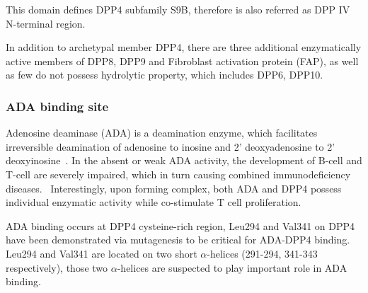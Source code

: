 This domain defines DPP4 subfamily S9B, therefore is also referred as DPP IV N-terminal region.
\par 
In addition to archetypal member DPP4, there are three additional enzymatically active members of DPP8, DPP9 and Fibroblast activation protein (FAP), as well as few do not possess hydrolytic property, which includes DPP6, DPP10. 

\subsubsection{ADA binding site}
Adenosine deaminase (ADA) is a deamination enzyme, which facilitates irreversible deamination of adenosine to inosine and 2' deoxyadenosine to 2' deoxyinosine~\cite{Franco_1998}. In the absent or weak ADA activity, the development of B-cell and T-cell are severely impaired, which in turn causing combined immunodeficiency diseases.~\cite{Cristalli2001} Interestingly, upon forming complex, both ADA and DPP4 possess individual enzymatic activity while co-stimulate T cell proliferation.~\cite{De_Meester_1999}  
\par 
ADA binding occurs at DPP4 cysteine-rich region,
Leu294 and Val341 on DPP4 have been demonstrated via mutagenesis to be critical for ADA-DPP4 binding.~\cite{Abbott_1999} Leu294 and Val341 are located on two short $\alpha$-helices (291-294, 341-343 respectively), those two $\alpha$-helices are suspected to play important role in ADA binding. 